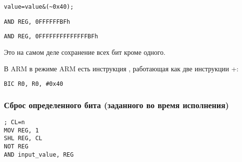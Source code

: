 \begin{lstlisting}[caption=\CCpp]
value=value&(~0x40);
\end{lstlisting}

\begin{lstlisting}[caption=x86]
AND REG, 0FFFFFFBFh
\end{lstlisting}

\begin{lstlisting}[caption=x64]
AND REG, 0FFFFFFFFFFFFFFBFh
\end{lstlisting}

Это на самом деле сохранение всех бит кроме одного.

В ARM в режиме ARM есть инструкция \BIC, работающая как две инструкции \NOT+\AND:

\begin{lstlisting}[caption=ARM (\ARMMode)]
BIC R0, R0, #0x40
\end{lstlisting}

\subsubsection{Сброс определенного бита (заданного во время исполнения)}



\begin{lstlisting}[caption=x86]
; CL=n
MOV REG, 1
SHL REG, CL
NOT REG
AND input_value, REG
\end{lstlisting}
